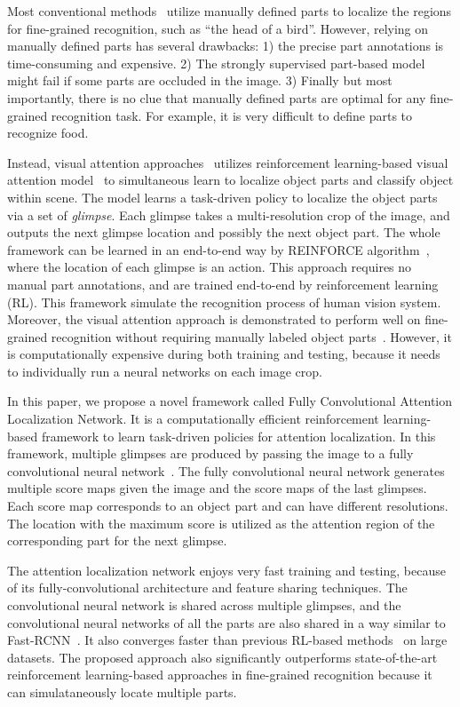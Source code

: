 \documentclass[10pt,twocolumn,letterpaper]{article}
\begin{document}
Most conventional methods~\cite{bd10,bd15} utilize manually defined parts to localize the regions for fine-grained recognition, such as ``the head of a bird''.
However, relying on manually defined parts has several drawbacks: 1) the precise part annotations is time-consuming and expensive.
2) The strongly supervised part-based model might fail if  some parts are occluded in the image.
3) Finally but most importantly, there is no clue that manually defined parts are optimal for any fine-grained recognition task.
For example, it is very difficult to define parts to recognize food.


Instead, visual attention approaches~\cite{bd3} utilizes reinforcement learning-based visual attention model~\cite{bd1} to simultaneous learn to localize object parts and classify object within scene.
The model learns a task-driven policy to localize the object parts via a set of {\em glimpse}.
Each glimpse takes a multi-resolution crop of the image, and outputs the next glimpse location and possibly the next object part.
The whole framework can be learned in an end-to-end way by REINFORCE algorithm~\cite{bd20}, where the location of each glimpse is an action.
This approach requires no manual part annotations, and are trained end-to-end by reinforcement learning (RL).
This framework simulate the recognition process of human vision system.
Moreover, the visual attention approach is demonstrated to perform well on fine-grained recognition without requiring manually labeled object parts~\cite{bd3}.
However, it is computationally expensive during both training and testing, because it  needs to individually run a neural networks on each image crop.


In this paper, we propose a novel framework called Fully Convolutional Attention Localization Network.
It is a computationally efficient reinforcement learning-based framework to learn task-driven policies for attention localization.
In this framework, multiple glimpses are produced by passing the image to a fully convolutional neural network~\cite{bd7, bd8}.
The fully convolutional neural network generates multiple score maps given the image and the score maps of the last glimpses.
Each score map corresponds to an object part and can have different resolutions.
The location with the maximum score is utilized as the attention region of the corresponding part for the next glimpse.


The attention localization network enjoys very fast training and testing, because of its fully-convolutional architecture and feature sharing techniques.
The convolutional neural network is shared across multiple glimpses, and the convolutional neural networks of all the parts are also shared in a way similar to Fast-RCNN~\cite{girshick2015fast}.
It also converges faster than previous RL-based methods~\cite{bd1,bd2,bd3} on large datasets.
The proposed approach also significantly outperforms state-of-the-art reinforcement learning-based approaches in fine-grained recognition because it can simulataneously locate multiple parts.
\end{document}
